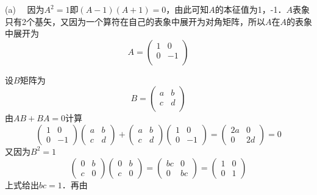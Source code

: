 (a) \ \ 因为$A^2=1$即$(A-1)(A+1)=0$，由此可知$A$的本征值为1，-1．$A$表象只有2个基矢，又因为一个算符在自己的表象中展开为对角矩阵，所以$A$在$A$的表象中展开为
$$
A=\left( \begin{matrix}
	1&		0\\
	0&		-1\\
\end{matrix} \right) 
$$

设$B$矩阵为
$$
B=\left( \begin{matrix}
	a&		b\\
	c&		d\\
\end{matrix} \right) 
$$
由$AB+BA=0$计算
$$
\left(\begin{array}{cc}
1 & 0 \\
0 & -1
\end{array}\right)\left(\begin{array}{ll}
a & b \\
c & d
\end{array}\right)+\left(\begin{array}{ll}
a & b \\
c & d
\end{array}\right)\left(\begin{array}{cc}
1 & 0 \\
0 & -1
\end{array}\right)=\left(\begin{array}{cc}
2 a & 0 \\
0 & 2 d
\end{array}\right)=0
$$
又因为$B^2=1$
$$
\left(\begin{array}{ll}
0 & b \\
c & 0
\end{array}\right)\left(\begin{array}{ll}
0 & b \\
c & 0
\end{array}\right)=\left(\begin{array}{ll}
b c & 0 \\
0 & b c
\end{array}\right)=\left(\begin{array}{ll}
1 & 0 \\
0 & 1
\end{array}\right)$$
上式给出$bc=1$．再由